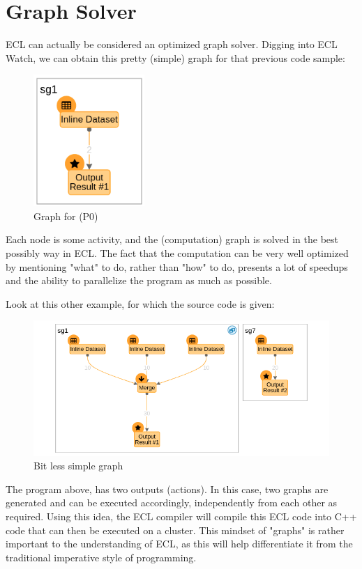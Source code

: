 \documentclass[a4paper,oneside,12pt]{book}
\begin{document}
\section{Graph Solver}

ECL can actually be considered an optimized graph solver. Digging into ECL Watch, we can obtain this pretty (simple) graph for that previous code sample:
\begin{figure}[h]
    \centering
    \includegraphics[height=5cm]{../media/simplegraph}
    \caption{Graph for (P0)}
\end{figure}

Each node is some activity, and the (computation) graph is solved in the best possibly way in ECL. The fact that the computation can be very well optimized by mentioning "what" to do, rather than "how" to do, presents a lot of speedups and the ability to parallelize the program as much as possible.

Look at this other example, for which the source code is given:



\begin{figure}[h]
    \centering
    \includegraphics[width=.7\linewidth]{../media/bitlesssimplegraph.png}
    \caption{Bit less simple graph}
\end{figure}

The program above, has two outputs (actions). In this case, two graphs are generated and can be executed accordingly, independently from each other as required. Using this idea, the ECL compiler will compile this ECL code into C++ code that can then be executed on a cluster. This mindset of "graphs" is rather important to the understanding of ECL, as this will help differentiate it from the traditional imperative style of programming.
\end{document}
